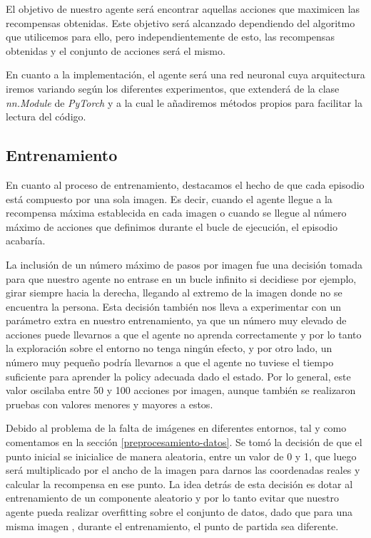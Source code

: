El objetivo de nuestro agente será encontrar aquellas acciones que maximicen las recompensas obtenidas. Este objetivo será alcanzado dependiendo del algoritmo que utilicemos para ello, pero independientemente de esto, las recompensas obtenidas y el conjunto de acciones será el mismo.
\medskip

En cuanto a la implementación, el agente será una red neuronal cuya arquitectura iremos variando según los diferentes experimentos, que extenderá de la clase \textit{nn.Module} de \textit{PyTorch} y a la cual le añadiremos métodos propios para facilitar la lectura del código.


\subsection{Entrenamiento}
\label{entrenamiento}

En cuanto al proceso de entrenamiento, destacamos el hecho de que cada episodio está compuesto por una sola imagen. Es decir, cuando el agente llegue a la recompensa máxima establecida en cada imagen o cuando se llegue al número máximo de acciones que definimos durante el bucle de ejecución, el episodio acabaría. 
\medskip

La inclusión de un número máximo de pasos por imagen fue una decisión tomada para que nuestro agente no entrase en un bucle infinito si decidiese por ejemplo, girar siempre hacia la derecha, llegando al extremo de la imagen donde no se encuentra la persona. Esta decisión también nos lleva a experimentar con un parámetro extra en nuestro entrenamiento, ya que un número muy elevado de acciones puede llevarnos a que el agente no aprenda correctamente y por lo tanto la exploración sobre el entorno no tenga ningún efecto, y por otro lado, un número muy pequeño podría llevarnos a que el agente no tuviese el tiempo suficiente para aprender la policy adecuada dado el estado. Por lo general, este valor oscilaba entre 50 y 100 acciones por imagen, aunque también se realizaron pruebas con valores menores y mayores a estos.
\medskip

Debido al problema de la falta de imágenes en diferentes entornos, tal y como comentamos en la sección \ref{preprocesamiento-datos}. Se tomó la decisión de que el punto inicial se inicialice de manera aleatoria, entre un valor de 0 y 1, que luego será multiplicado por el ancho de la imagen para darnos las coordenadas reales y calcular la recompensa en ese punto. La idea detrás de esta decisión es dotar al entrenamiento de un componente aleatorio y por lo tanto evitar que nuestro agente pueda realizar overfitting sobre el conjunto de datos, dado que para una misma imagen , durante el entrenamiento, el punto de partida sea diferente.
\medskip

